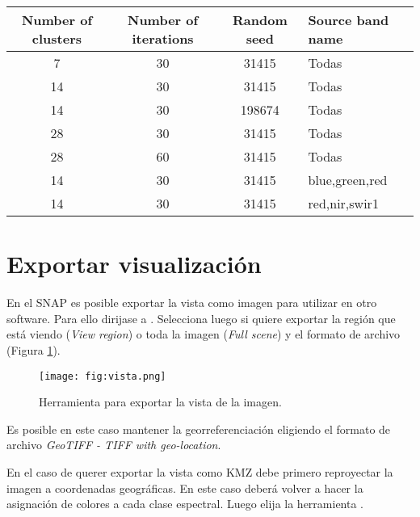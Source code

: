 \begin{table}[h]
\centering
\begin{tabular}{cccl}
\toprule
Number of clusters & Number of iterations & Random seed & Source band name \\ \midrule
7                  & 30                   & 31415       & Todas            \\
14                 & 30                   & 31415       & Todas            \\
14                 & 30                   & 198674      & Todas            \\
28                 & 30                   & 31415       & Todas            \\
28                 & 60                   & 31415       & Todas            \\
14                 & 30                   & 31415       & blue,green,red   \\
14                 & 30                   & 31415       & red,nir,swir1    \\ \bottomrule
\end{tabular}
\end{table}

\section{Exportar visualización}

En el SNAP es posible exportar la vista como imagen para utilizar en otro software. Para ello dirijase a . Selecciona luego si quiere exportar la región que está viendo (\emph{View region}) o toda la imagen (\emph{Full scene}) y el formato de archivo (Figura \ref{fig:vista}).

\begin{figure}[h!]
    \centering
    \texttt{[image: fig:vista.png]}
    \caption{Herramienta para exportar la vista de la imagen.}
    \label{fig:vista}
\end{figure}

Es posible en este caso mantener la georreferenciación eligiendo el formato de archivo \emph{GeoTIFF - TIFF with geo-location}.

En el caso de querer exportar la vista como KMZ debe primero reproyectar la imagen a coordenadas geográficas. En este caso deberá volver a hacer la asignación de colores a cada clase espectral. Luego elija la herramienta .
